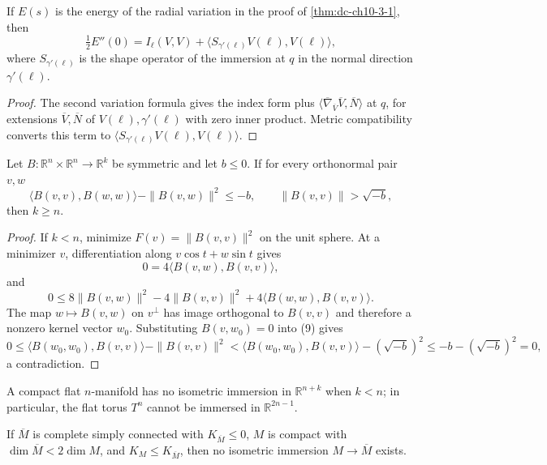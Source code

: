 \begin{lemma}
  \label{lem:dc-ch10-3-2}
  If $E(s)$ is the energy of the radial variation in the proof of
  \cref{thm:dc-ch10-3-1}, then
  \[
  \tfrac12E''(0)=I_\ell(V,V)+
  \langle S_{\gamma'(\ell)}V(\ell),V(\ell)\rangle,
  \]
  where $S_{\gamma'(\ell)}$ is the shape operator of the immersion at $q$ in the
  normal direction $\gamma'(\ell)$.
\end{lemma}
\begin{proof}
  \sketch
  The second variation formula gives the index form plus
  $\langle\overline\nabla_{\overline V}\overline V,\overline N\rangle$ at $q$, for
  extensions $\overline V,\overline N$ of $V(\ell),\gamma'(\ell)$ with zero inner
  product. Metric compatibility converts this term to
  $\langle S_{\gamma'(\ell)}V(\ell),V(\ell)\rangle$.
\end{proof}

\begin{lemma}
  \label{lem:dc-ch10-3-3}
  Let $B:\mathbb R^n\times\mathbb R^n\to\mathbb R^k$ be symmetric and let $b\leq0$.
  If for every orthonormal pair $v,w$
  \[
  \langle B(v,v),B(w,w)\rangle-\|B(v,w)\|^2\leq-b,
  \qquad \|B(v,v)\|>\sqrt{-b},
  \]
  then $k\geq n$.
\end{lemma}
\begin{proof}
  \sketch
  If $k<n$, minimize $F(v)=\|B(v,v)\|^2$ on the unit sphere. At a minimizer $v$,
  differentiation along $v\cos t+w\sin t$ gives
  \[
  0=4\langle B(v,w),B(v,v)\rangle, \tag{8}
  \]
  and
  \[
  0\leq 8\|B(v,w)\|^2-4\|B(v,v)\|^2+
  4\langle B(w,w),B(v,v)\rangle. \tag{9}
  \]
  The map $w\mapsto B(v,w)$ on $v^\perp$ has image orthogonal to $B(v,v)$ and
  therefore a nonzero kernel vector $w_0$. Substituting $B(v,w_0)=0$ into (9) gives
  \[
  0\leq\langle B(w_0,w_0),B(v,v)\rangle-\|B(v,v)\|^2
  <\langle B(w_0,w_0),B(v,v)\rangle-(\sqrt{-b})^2
  \leq-b-(\sqrt{-b})^2=0,
  \]
  a contradiction.
\end{proof}

\begin{corollary}
  \label{cor:dc-ch10-3-4}
  A compact flat $n$-manifold has no isometric immersion in $\mathbb R^{n+k}$ when
  $k<n$; in particular, the flat torus $T^n$ cannot be immersed in
  $\mathbb R^{2n-1}$.
\end{corollary}

\begin{corollary}
  \label{cor:dc-ch10-3-5}
  If $\overline M$ is complete simply connected with $K_{\overline M}\leq0$, $M$ is
  compact with $\dim\overline M<2\dim M$, and $K_M\leq K_{\overline M}$, then no
  isometric immersion $M\to\overline M$ exists.
\end{corollary}

